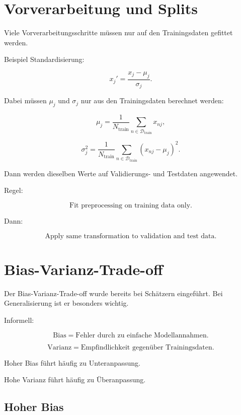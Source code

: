 \section{Vorverarbeitung und Splits}

Viele Vorverarbeitungsschritte müssen nur auf den Trainingsdaten gefittet werden.

Beispiel Standardisierung:

\[
    x_j'
    =
    \frac{x_j-\mu_j}{\sigma_j}.
\]

Dabei müssen \(\mu_j\) und \(\sigma_j\) nur aus den Trainingsdaten berechnet werden:

\[
    \mu_j
    =
    \frac{1}{N_{\mathrm{train}}}
    \sum_{n\in\mathcal{D}_{\mathrm{train}}}
    x_{nj},
\]

\[
    \sigma_j^2
    =
    \frac{1}{N_{\mathrm{train}}}
    \sum_{n\in\mathcal{D}_{\mathrm{train}}}
    (x_{nj}-\mu_j)^2.
\]

Dann werden dieselben Werte auf Validierungs- und Testdaten angewendet.

\begin{examtipbox}
Regel:

\[
    \text{Fit preprocessing on training data only.}
\]

Dann:

\[
    \text{Apply same transformation to validation and test data.}
\]
\end{examtipbox}

\section{Bias-Varianz-Trade-off}

Der Bias-Varianz-Trade-off wurde bereits bei Schätzern eingeführt.
Bei Generalisierung ist er besonders wichtig.

Informell:

\[
    \text{Bias}
    =
    \text{Fehler durch zu einfache Modellannahmen}.
\]

\[
    \text{Varianz}
    =
    \text{Empfindlichkeit gegenüber Trainingsdaten}.
\]

\begin{conceptbox}
Hoher Bias führt häufig zu Unteranpassung.

Hohe Varianz führt häufig zu Überanpassung.
\end{conceptbox}

\subsection{Hoher Bias}


